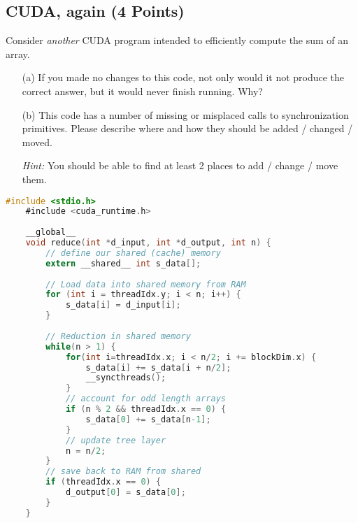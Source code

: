 \documentclass[]{article}
\begin{document}
\subsection{CUDA, again (4 Points)}
Consider \textit{another} CUDA program intended to efficiently compute the sum of an array.
\begin{itemize}
    \item [(a)] If you made no changes to this code, not only would it not produce the correct answer, but it would never finish running. Why?
    \item [(b)] This code has a number of missing or misplaced calls to synchronization primitives. Please describe where and how they should be added / changed / moved.
    \begin{tcolorbox}[left=14pt, arc=0pt, outer arc=0pt, colframe=SeaGreen!10, colback=SeaGreen!10]
    \textit{Hint:} You should be able to find at least 2 places to add / change / move them.
    \end{tcolorbox}
\end{itemize}


\begin{tcolorbox}[left=14pt, arc=0pt, outer arc=0pt, colframe=blue!5, colback=blue!5]
\begin{lstlisting}[language=C]
    #include <stdio.h>
    #include <cuda_runtime.h>
    
    __global__ 
    void reduce(int *d_input, int *d_output, int n) {
        // define our shared (cache) memory
        extern __shared__ int s_data[];
        
        // Load data into shared memory from RAM
        for (int i = threadIdx.y; i < n; i++) {
            s_data[i] = d_input[i];
        }
    
        // Reduction in shared memory
        while(n > 1) {
            for(int i=threadIdx.x; i < n/2; i += blockDim.x) {
                s_data[i] += s_data[i + n/2];
                __syncthreads();
            }
            // account for odd length arrays
            if (n % 2 && threadIdx.x == 0) {
                s_data[0] += s_data[n-1];
            } 
            // update tree layer
            n = n/2;
        }
        // save back to RAM from shared
        if (threadIdx.x == 0) {
            d_output[0] = s_data[0];
        }
    }
\end{lstlisting}
\end{tcolorbox}
\end{document}

